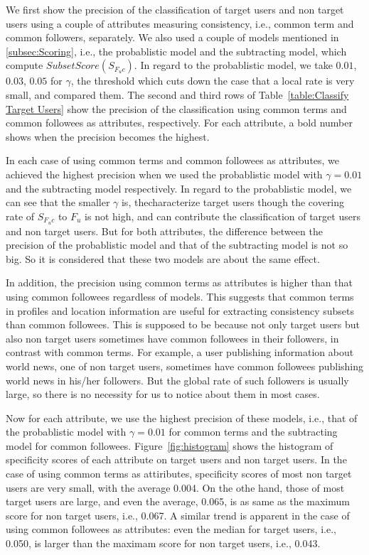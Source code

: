 We first show the precision of the classification of target users and
non target users using a couple of attributes measuring consistency,
i.e., common term and common followers, separately.  We also used a
couple of models mentioned in \ref{subsec:Scoring}, i.e., the
probablistic model and the subtracting model, which compute
$\mathit{SubsetScore}(S_{F_uc})$.  In regard to the probablistic model,
we take $0.01$, $0.03$, $0.05$ for $\gamma$, the threshold which cuts
down the case that a local rate is very small, and
compared them.  The second and third rows of Table~\ref{table:Classify
Target Users} show the precision of the classification using common
terms and common followees as attributes, respectively.  For each
attribute, a bold number shows when the precision becomes the highest.

In each case of using common terms and common followees as attributes,
we achieved the highest precision when we used the probablistic model
with $\gamma = 0.01$ and the subtracting model respectively.  In regard
to the probablistic model, we can see that the smaller $\gamma$ is,
thecharacterize target users though the covering rate of $S_{F_uc}$ to
$F_u$ is not high, and can contribute the classification of target users
and non target users.  But for both attributes, the difference between
the precision of the probablistic model and that of the subtracting
model is not so big.  So it is considered that these two models are
about the same effect.

In addition, the precision using common terms as attributes is higher
than that using common followees regardless of models.  This suggests
that common terms in profiles and location information are useful for
extracting consistency subsets than common followees.  This is supposed
to be because not only target users but also non target users sometimes
have common followees in their followers, in contrast with common terms.
For example, a user publishing information about world news, one of non
target users, sometimes have common followees publishing world news in
his/her followers.  But the global rate of such followers is usually
large, so there is no necessity for us to notice about them in most
cases.

Now for each attribute, we use the highest precision of these models,
i.e., that of the probablistic model with $\gamma=0.01$ for common terms
and the subtracting model for common
followees. Figure~\ref{fig:histogram} shows the histogram of specificity
scores of each attribute on target users and non target users.  In the
case of using common terms as attiributes, specificity scores of most
non target users are very small, with the average 0.004.  On the othe
hand, those of most target users are large, and even the average, 0.065,
is as same as the maximum score for non target users, i.e., 0.067.  A
similar trend is apparent in the case of using common followees as
attributes: even the median for target users, i.e., 0.050, is larger
than the maximam score for non target users, i.e., 0.043.

